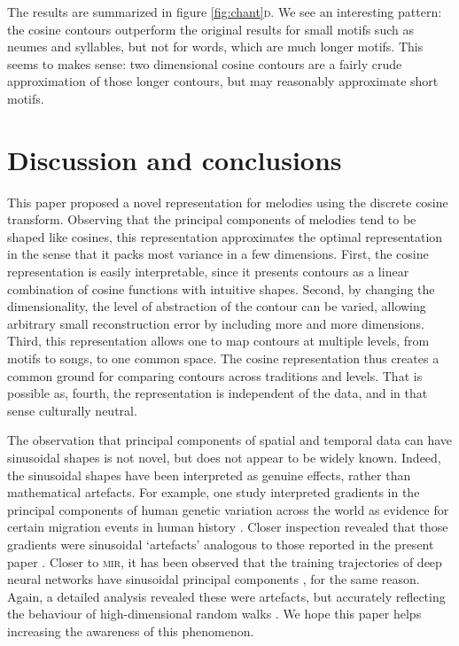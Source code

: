 \documentclass{article}
\begin{document}
The results are summarized in figure \ref{fig:chant}\textsc{d}.
We see an interesting pattern: the cosine contours outperform the original results for small motifs such as neumes and syllables, but not for words, which are much longer motifs. 
This seems to makes sense: two dimensional cosine contours are a fairly crude approximation of those longer contours, but may reasonably approximate short motifs.


\section{Discussion and conclusions}


This paper proposed a novel representation for melodies using the discrete cosine transform.
Observing that the principal components of melodies tend to be shaped like cosines, this representation approximates the optimal representation in the sense that it packs most variance in a few dimensions.
First, the cosine representation is easily interpretable, since it presents contours as a linear combination of cosine functions with intuitive shapes.
Second, by changing the dimensionality, the level of abstraction of the contour can be varied, allowing arbitrary small reconstruction error by including more and more dimensions.
Third, this representation allows one to map contours at multiple levels, from motifs to songs, to one common space.
The cosine representation thus creates a common ground for comparing contours across traditions and levels.
That is possible as, fourth, the representation is independent of the data, and in that sense culturally neutral.


The observation that principal components of spatial and temporal data can have sinusoidal shapes is not novel, but does not appear to be widely known.
Indeed, the sinusoidal shapes have been interpreted as genuine effects, rather than mathematical artefacts.
For example, one study interpreted gradients in the principal components of human genetic variation across the world as evidence for certain migration events in human history \cite{Cavalli-Sforza1993}.
Closer inspection revealed that those gradients were sinusoidal `artefacts' analogous to those reported in the present paper \cite{Novembre2008}.
Closer to \textsc{mir}, it has been observed that the training trajectories of deep neural networks have sinusoidal principal components \cite{Lorch2016}, for the same reason.
Again, a detailed analysis \cite{Antognini2018} revealed these were artefacts, but accurately reflecting the behaviour of high-dimensional random walks \cite{Antognini2018,Moore2018}. 
We hope this paper helps increasing the awareness of this phenomenon.
\end{document}
